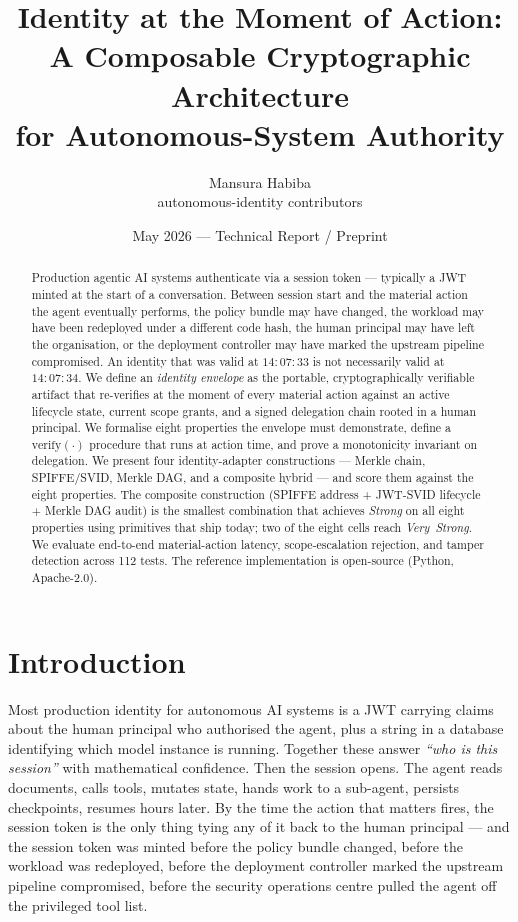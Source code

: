 \documentclass[11pt,a4paper]{article}
\title{\bfseries Identity at the Moment of Action:\\
A Composable Cryptographic Architecture\\for Autonomous-System Authority}
\author{Mansura Habiba\\\small autonomous-identity contributors}
\date{May 2026 --- Technical Report / Preprint}
\begin{document}
\maketitle

\begin{abstract}
Production agentic AI systems authenticate via a session token --- typically
a JWT minted at the start of a conversation. Between session start and the
material action the agent eventually performs, the policy bundle may have
changed, the workload may have been redeployed under a different code hash,
the human principal may have left the organisation, or the deployment
controller may have marked the upstream pipeline compromised. An identity
that was valid at $14{:}07{:}33$ is not necessarily valid at $14{:}07{:}34$.
We define an \emph{identity envelope} as the portable, cryptographically
verifiable artifact that re-verifies at the moment of every material action
against an active lifecycle state, current scope grants, and a signed
delegation chain rooted in a human principal. We formalise eight properties
the envelope must demonstrate, define a $\mathrm{verify}(\cdot)$ procedure
that runs at action time, and prove a monotonicity invariant on delegation.
We present four identity-adapter constructions --- Merkle chain, SPIFFE/SVID,
Merkle DAG, and a composite hybrid --- and score them against the eight
properties. The composite construction (SPIFFE address + JWT-SVID lifecycle
$+$ Merkle DAG audit) is the smallest combination that achieves
\emph{Strong} on all eight properties using primitives that ship today;
two of the eight cells reach \emph{Very~Strong}. We evaluate end-to-end
material-action latency, scope-escalation rejection, and tamper detection
across 112 tests. The reference implementation is open-source
(Python, Apache-2.0).
\end{abstract}

\section{Introduction}\label{sec:intro}

Most production identity for autonomous AI systems is a JWT carrying claims
about the human principal who authorised the agent, plus a string in a
database identifying which model instance is running. Together these
answer \emph{``who is this session''} with mathematical confidence.
Then the session opens. The agent reads documents, calls tools, mutates
state, hands work to a sub-agent, persists checkpoints, resumes hours
later. By the time the action that matters fires, the session token is
the only thing tying any of it back to the human principal --- and the
session token was minted before the policy bundle changed, before the
workload was redeployed, before the deployment controller marked the
upstream pipeline compromised, before the security operations centre
pulled the agent off the privileged tool list.
\end{document}
